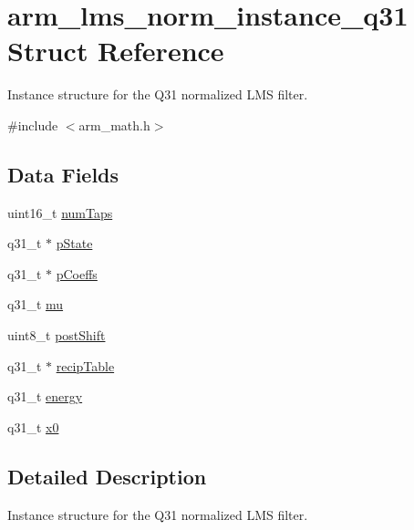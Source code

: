 \hypertarget{structarm__lms__norm__instance__q31}{\section{arm\-\_\-lms\-\_\-norm\-\_\-instance\-\_\-q31 Struct Reference}
\label{structarm__lms__norm__instance__q31}
}


Instance structure for the Q31 normalized L\-M\-S filter.  




{\ttfamily \#include $<$arm\-\_\-math.\-h$>$}

\subsection*{Data Fields}
\begin{DoxyCompactItemize}
\item 
uint16\-\_\-t \hyperlink{structarm__lms__norm__instance__q31_a751941891e47f522a7f5375fe8990aac}{num\-Taps}
\item 
q31\-\_\-t $\ast$ \hyperlink{structarm__lms__norm__instance__q31_adee4ba3ee8869865af7d8fa08ca913d6}{p\-State}
\item 
q31\-\_\-t $\ast$ \hyperlink{structarm__lms__norm__instance__q31_a68888e36167d81cb7836db10367a1682}{p\-Coeffs}
\item 
q31\-\_\-t \hyperlink{structarm__lms__norm__instance__q31_a21ab4237a726ea7751f5026d89d2e577}{mu}
\item 
uint8\-\_\-t \hyperlink{structarm__lms__norm__instance__q31_a74050e9f36542bd56f4052381a82ae8f}{post\-Shift}
\item 
q31\-\_\-t $\ast$ \hyperlink{structarm__lms__norm__instance__q31_aec8a88dd688519b6b1e3c8d2e24bb775}{recip\-Table}
\item 
q31\-\_\-t \hyperlink{structarm__lms__norm__instance__q31_a012fee0f71095d2557bb633e73ef7355}{energy}
\item 
q31\-\_\-t \hyperlink{structarm__lms__norm__instance__q31_a973b8350a0c7b113a5f002bc0b86bf76}{x0}
\end{DoxyCompactItemize}


\subsection{Detailed Description}
Instance structure for the Q31 normalized L\-M\-S filter. 

